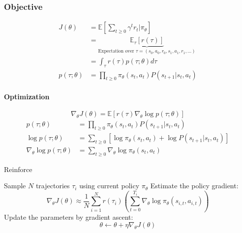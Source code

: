 \documentclass[a4paper,6pt,twocolumn,fleqn]{article}
\begin{document}
\subsubsection{Objective} %
\begin{align}
    J(\theta) &= \mathbb{E} \left[
        \sum_{t \geq 0} \gamma^t r_t | \pi_\theta
    \right]\\
    &= \underbrace{\mathbb{E}_\tau [r(\tau)]}_{\text{Expectation over } \tau = (s_0, a_0, r_0, s_1, a_1, r_1, ...)}\\
    &= \int_\tau r(\tau) p(\tau; \theta) d\tau\\
    p(\tau; \theta) &= \prod_{t \geq 0} \pi_\theta (s_t,a_t) P(s_{t+1} | s_t, a_t)
\end{align}
\paragraph{Optimization}
\begin{equation}
    \nabla_\theta J(\theta) = \mathbb{E} [r(\tau) \nabla_\theta \log p(\tau; \theta)]
\end{equation}
\begin{align}
    p(\tau; \theta) &= \prod_{t \geq 0} \pi_\theta (s_t, a_t) P(s_{t+1} | s_t, a_t)\\
    \log p(\tau ; \theta) &= \sum_{t \geq 0} [\log \pi_\theta (s_t, a_t) + \log P(s_{t+1} | s_t, a_t)]\\
    \nabla_\theta \log p(\tau; \theta) &= \sum_{t \geq 0} \nabla_\theta \log \pi_\theta (s_t, a_t)
\end{align}
\begin{algorithm}
    \caption{Reinforce}
    Sample \(N\) trajectories \(\tau_i\) using current policy \(\pi_\theta\)\;
    Estimate the policy gradient:
    \begin{equation}
        \nabla_\theta J (\theta) \approx \frac 1 N \sum_{i=1}^N r (\tau_i) \left(
            \sum_{t=0}^{T_i} \nabla_\theta \log \pi_\theta (s_{i,t}, a_{i,t})
        \right)
    \end{equation}
    Update the parameters by gradient ascent:
    \begin{equation}
        \theta \gets \theta + \eta \nabla_\theta J(\theta)
    \end{equation}
\end{algorithm}

\end{document}

